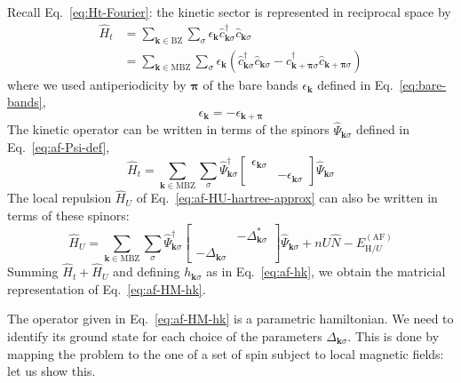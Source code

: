 \begin{tabproof}
	
	Recall Eq.~\eqref{eq:Ht-Fourier}: the kinetic sector is represented in reciprocal space by
	\[
	\begin{aligned}
		\hat H_t &= \sum_{\mathbf{k} \in \mathrm{BZ}} \sum_\sigma \epsilon_\mathbf{k} \hat c_{\mathbf{k}\sigma}^\dagger \hat c_{\mathbf{k}\sigma} \\ 
		&= \sum_{\mathbf{k} \in \mathrm{MBZ}} \sum_\sigma \epsilon_\mathbf{k} \left(\hat c_{\mathbf{k}\sigma}^\dagger \hat c_{\mathbf{k}\sigma} - \hat c_{\mathbf{k}+\bm{\pi}\sigma}^\dagger \hat c_{\mathbf{k}+\bm{\pi}\sigma}\right) 
	\end{aligned}
	\]
	where we used antiperiodicity by $\bm{\pi}$ of the bare bands $\epsilon_\mathbf{k}$ defined in Eq.~\eqref{eq:bare-bands},
	\[
	\epsilon_\mathbf{k} = -\epsilon_{\mathbf{k}+\bm{\pi}}
	\]
	The kinetic operator can be written in terms of the spinors $\hat \Psi_{\mathbf{k}\sigma}$ defined in Eq.~\eqref{eq:af-Psi-def},
	\[
	\hat H_t = \sum_{\mathbf{k} \in \mathrm{MBZ}} \sum_\sigma \hat \Psi_{\mathbf{k}\sigma}^\dagger \begin{bmatrix}
		\epsilon_{\mathbf{k}\sigma} & \\ & -\epsilon_{\mathbf{k}\sigma}
	\end{bmatrix} \hat \Psi_{\mathbf{k}\sigma}
	\]
	The local repulsion $\hat H_U$ of Eq.~\eqref{eq:af-HU-hartree-approx} can also be written in terms of these spinors:
	\[
	\hat H_U = \sum_{\mathbf{k} \in  \mathrm{MBZ}} \sum_\sigma \hat \Psi_{\mathbf{k}\sigma}^\dagger \begin{bmatrix}
		& -\Delta_{\mathbf{k}\sigma}^* \\  -\Delta_{\mathbf{k}\sigma} & 
	\end{bmatrix} \hat \Psi_{\mathbf{k}\sigma}  + nU \hat N - E_{\mathrm{H}/U}^{(\mathrm{AF})}
	\]
	Summing $\hat H_t + \hat H_U$ and defining $h_{\mathbf{k}\sigma}$ as in Eq.~\eqref{eq:af-hk}, we obtain the matricial representation of Eq.~\eqref{eq:af-HM-hk}.
	
\end{tabproof}

The operator given in Eq.~\eqref{eq:af-HM-hk} is a parametric hamiltonian. We need to identify its ground state for each choice of the parameters $\Delta_{\mathbf{k}\sigma}$. This is done by mapping the problem to the one of a set of spin subject to local magnetic fields: let us show this. 

